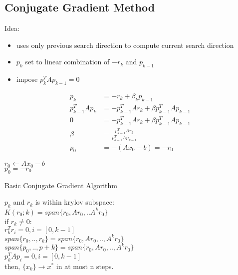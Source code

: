 \documentclass[8pt,letter]{article}
\begin{document}
\begin{multicols*}{2}
  \vfill\null
  \pagebreak
  
  \subsection{Conjugate Gradient Method}
  Idea:
  \begin{itemize}
  \item uses only previous search direction to compute current search direction
  \item $p_k$ set to linear combination of $-r_k$ and $p_{k-1}$
  \item impose $p_k^T A p_{k-1}=0$
  \end{itemize}
  \begin{align*}
    p_k &= -r_k + \beta_k p_{k-1}\\
    p_{k-1}^T A p_k &= -p_{k-1}^T A r_k + \beta p_{k-1}^T A p_{k-1}\\
    0 &= -p_{k-1}^T A r_k + \beta p_{k-1}^T A p_{k-1}\\
    \beta &= \frac{p_{k-1}^T A r_k}{p_{k-1}^T A p_{k-1}}\\
    p_0& = -(Ax_0-b)=-r_0
  \end{align*}
  \begin{algorithm}[H]
    $r_0 \leftarrow Ax_0-b$\\
    $p_0 = -r_0$\\
    \caption{Basic Conjugate Gradient Algorithm\label{Algo_CGBasic}}
  \end{algorithm}
  $p_k$ and $r_k$ is within krylov subspace:\\
  $K(r_0;k) =span\{r_0, Ar_0, ..A^k r_0\}$\\
  if $r_k \not= 0$:\\
  $r_k^T r_i = 0, i=[0,k-1]$\\
  $span\{r_0,..,r_k\} = span\{r_0,Ar_0,..,A^k r_0\}$\\
  $span\{p_0,..,p+k\}=span\{r_0,Ar_0,..,A^k r_0\}$\\
  $p_k^T A p_i=0, i=[0,k-1]$\\
  then, $\{x_k\} \rightarrow x^*$ in at most n steps.\\


\end{multicols*}
\end{document}
